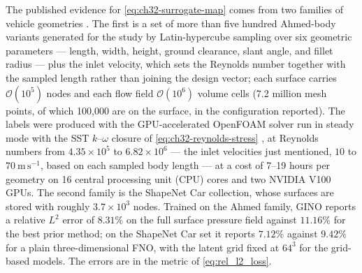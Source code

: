 \begin{case_study}
\label{case:ch32-ahmed}
The published evidence for \eqref{eq:ch32-surrogate-map} comes from two families of vehicle
geometries \cite{li2023geometry}. The first is a set of more than five hundred Ahmed-body
variants generated for the study by Latin-hypercube sampling over six geometric
parameters --- length, width, height, ground clearance, slant angle, and fillet radius --- plus the
inlet velocity, which sets the Reynolds number together with the sampled
length rather than joining the design vector; each surface carries $\mathcal{O}(10^{5})$
nodes and each
flow field $\mathcal{O}(10^{6})$ volume cells (7.2 million mesh points, of which 100{,}000 are on
the surface, in the configuration reported). The labels were produced with the GPU-accelerated
OpenFOAM solver run in steady mode with the SST $k$--$\omega$
closure of \eqref{eq:ch32-reynolds-stress} \cite{menter1994two}, at Reynolds numbers from $4.35\times10^{5}$ to
$6.82\times10^{6}$ --- the inlet velocities just mentioned, $10$ to $70\ \mathrm{m\,s^{-1}}$,
based on each sampled body length --- at
a cost of 7--19 hours per geometry on 16 central processing unit (CPU) cores and two NVIDIA V100
GPUs. The second family is the
ShapeNet Car collection, whose surfaces are stored with roughly
$3.7\times10^{3}$ nodes.
Trained on the Ahmed family, GINO reports a relative $L^2$ error of $8.31\%$ on the full surface
pressure field against $11.16\%$ for the best prior method; on the ShapeNet Car set it reports
$7.12\%$ against $9.42\%$ for a plain three-dimensional FNO, with the latent grid fixed at
$64^{3}$ for the grid-based models. The errors are in the metric of \eqref{eq:rel_l2_loss}.
\end{case_study}

